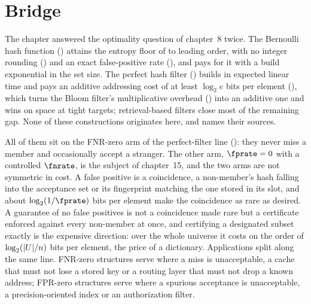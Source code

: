 %

\section{Bridge}
\label{sec:ch14-bridge}

The chapter answered the optimality question of chapter~8 twice. The
Bernoulli hash function () attains the entropy floor of
 to leading order, with no integer rounding
() and an exact false-positive rate
(), and pays for it with a build exponential in the
set size. The perfect hash filter () builds in expected
linear time and pays an additive addressing cost of at least $\log_2 e$
bits per element (), which turns the Bloom filter's
multiplicative overhead () into an additive
one and wins on space at tight targets; retrieval-based filters close
most of the remaining gap. None of these constructions originates here,
and  names their sources.

All of them sit on the FNR-zero arm of the perfect-filter line
(): they never miss a member and
occasionally accept a stranger. The other arm, $\fprate = 0$ with a
controlled $\fnrate$, is the subject of chapter~15, and the two arms are
not symmetric in cost. A false positive is a coincidence, a non-member's
hash falling into the acceptance set or its fingerprint matching the one
stored in its slot, and about $\log_2(1/\fprate)$ bits per element make
the coincidence as rare as desired. A guarantee of no false positives is
not a coincidence made rare but a certificate enforced against every
non-member at once, and certifying a designated subset exactly is the
expensive direction: over the whole universe it costs on the order of
$\log_2(|U|/n)$ bits per element, the price of a dictionary.
Applications split along the same line. FNR-zero structures serve where
a miss is unacceptable, a cache that must not lose a stored key or a
routing layer that must not drop a known address; FPR-zero structures
serve where a spurious acceptance is unacceptable, a precision-oriented
index or an authorization filter.

